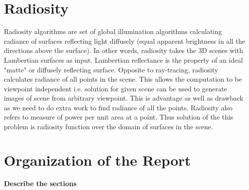 \section{Radiosity}

Radiosity algorithms are set of global illumination algorithms calculating radiance of surfaces reflecting light diffusely (equal apparent brightness in all the directions above the surface). In other words, radiosity takes the 3D scenes with Lambertian surfaces as input. Lambertian reflectance is the property of an ideal "matte" or diffusely reflecting surface. Opposite to ray-tracing, radiosity calculates radiance of all points in the scene. This allows the computation to be viewpoint independent i.e. solution for given scene can be used to generate images of scene from arbitrary viewpoint. This is advantage as well as drawback as we need to do extra work to find radiance of all the points. Radiosity also refers to measure of power per unit area at a point. Thus solution of the this problem is radiosity function over the domain of surfaces in the scene. 




\section{Organization of the Report}
{\bf Describe the sections}